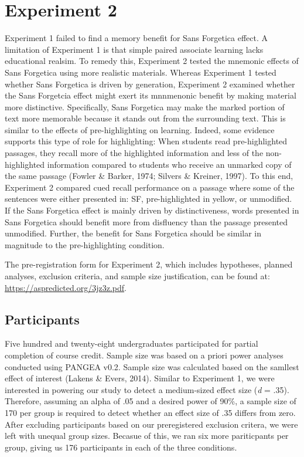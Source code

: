 \documentclass[english,doc]{apa6}
\begin{document}
\hypertarget{experiment-2}{%
\section{Experiment 2}\label{experiment-2}}

Experiment 1 failed to find a memory benefit for Sans Forgetica effect. A limitation of Experiment 1 is that simple paired associate learning lacks educational realsim. To remedy this, Experiment 2 tested the mnemonic effects of Sans Forgetica using more realistic materials. Whereas Experiment 1 tested whether Sans Forgetica is driven by generation, Experiment 2 examined whether the Sans Forgetcia effect might exert its mnnmenonic benefit by making material more distinctive. Specifically, Sans Forgetica may make the marked portion of text more memorable because it stands out from the surrounding text. This is similar to the effects of pre-highlighting on learning. Indeed, some evidence supports this type of role for highlighting: When students read pre-highlighted passages, they recall more of the highlighted information and less of the non-highlighted information compared to students who receive an unmarked copy of the same passage (Fowler \& Barker, 1974; Silvers \& Kreiner, 1997). To this end, Experiment 2 compared cued recall performance on a passage where some of the sentences were either presented in: SF, pre-highlighted in yellow, or unmodified. If the Sans Forgetica effect is mainly driven by distinctiveness, words presented in Sans Forgetica should benefit more from disfluency than the passage presented unmodified. Further, the benefit for Sans Forgetica should be similar in magnitude to the pre-highlighting condition.

The pre-registration form for Experiment 2, which includes hypotheses, planned analyses,
exclusion criteria, and sample size justification, can be found at: \url{https://aspredicted.org/3jz3z.pdf}.

\hypertarget{participants-1}{%
\subsection{Participants}\label{participants-1}}

Five hundred and twenty-eight undergraduates participated for partial completion of course credit. Sample size was based on a priori power analyses conducted using PANGEA v0.2. Sample size was calculated based on the samllest effect of interest (Lakens \& Evers, 2014). Similar to Experiment 1, we were interested in powering our study to detect a medium-sized effect size (\emph{d} = .35). Therefore, assuming an alpha of .05 and a desired power of 90\%, a sample size of 170 per group is required to detect whether an effect size of .35 differs from zero. After excluding participants based on our preregistered exclusion critera, we were left with unequal group sizes. Becasue of this, we ran six more pariticpants per group, giving us 176 participants in each of the three conditions.
\end{document}

